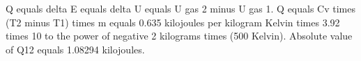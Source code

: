 Q equals delta E equals delta U equals U gas 2 minus U gas 1.  
Q equals Cv times (T2 minus T1) times m equals 0.635 kilojoules per kilogram Kelvin times 3.92 times 10 to the power of negative 2 kilograms times (500 Kelvin).  
Absolute value of Q12 equals 1.08294 kilojoules.